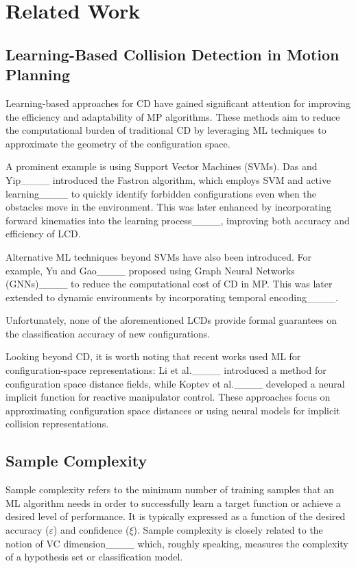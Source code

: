\section{Related Work}
\label{sec:related-work}

\subsection{Learning-Based Collision Detection in Motion Planning}
Learning-based approaches for CD have gained significant attention for improving the efficiency and adaptability of MP algorithms. These methods aim to reduce the computational burden of traditional CD by leveraging ML techniques to approximate the geometry of the configuration space.

A prominent example is using Support Vector Machines (SVMs). 
%
Das and Yip____ introduced the Fastron algorithm, which employs SVM and active learning____ to quickly identify forbidden configurations even when the obstacles move in the environment. 
This was later enhanced by incorporating forward kinematics into the learning process____, improving both accuracy and efficiency of LCD.


Alternative ML techniques beyond SVMs have also been introduced. 
For example, Yu and Gao____ proposed using Graph Neural Networks (GNNs)____ to reduce the computational cost of CD in MP.
This was later extended to dynamic environments by incorporating temporal encoding____.

Unfortunately, none of the aforementioned LCDs provide formal guarantees on the classification accuracy of new configurations.

{Looking beyond CD, it is worth noting that recent works used ML for configuration-space representations: 
Li et al.____ introduced a method for configuration space distance fields, 
while Koptev et al.____ developed a neural implicit function for reactive manipulator control.
These approaches focus on approximating configuration space distances or using neural models for implicit 
collision representations.}

\subsection{Sample Complexity}
Sample complexity refers to the minimum number of training samples that an ML algorithm needs in order to successfully learn a target function or achieve a desired level of performance. It is typically expressed as a function of the desired accuracy ($\varepsilon$) and confidence ($\xi$).
%
Sample complexity is closely related to the notion of VC dimension____ which, roughly speaking, measures the complexity of a hypothesis set or classification model.

